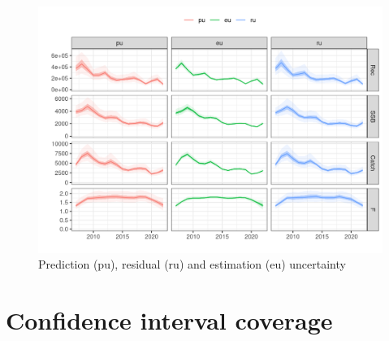 \documentclass[
]{book}
\begin{document}
\begin{figure}
\centering
\includegraphics{_bookdown_files/_main_files/figure-html/preduncert-1.png}
\caption{\label{fig:preduncert}Prediction (pu), residual (ru) and estimation (eu) uncertainty}
\end{figure}

\hypertarget{confidence-interval-coverage}{%
\section{Confidence interval coverage}\label{confidence-interval-coverage}}
\end{document}
